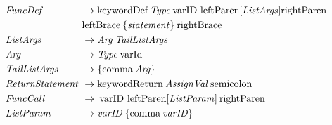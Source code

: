 \begin{align*}
    \omit $\mathit{FuncDef}$ \hfil &\rightarrow \text{keywordDef} \: \mathit{Type} \: \text{varID leftParen} [\mathit{ListArgs}] \text{rightParen} \\
    & \text{leftBrace} \: \{ \mathit{statement} \} \: \text{rightBrace} \\
    \omit $\mathit{ListArgs}$ \hfil &\rightarrow \mathit{Arg} \:  \mathit{TailListArgs} \\
    \omit $\mathit{Arg}$ \hfil &\rightarrow \mathit{Type} \: \text{varId} \\
    \omit $\mathit{TailListArgs}$ \hfil & \rightarrow \{ \text{comma} \: \mathit{Arg} \} \\
    \omit $\mathit{ReturnStatement}$ \hfil &\rightarrow \text{keywordReturn} \: \mathit{AssignVal} \: \text{semicolon} \\
    \omit $\mathit{FuncCall}$ \hfil &\rightarrow \: \text{varID leftParen} [\mathit{ListParam}] \: \text{rightParen} \\
    \omit $\mathit{ListParam}$ \hfil &\rightarrow \mathit{varID} \:  \{ \text{comma} \: \mathit{varID} \}
\end{align*}

